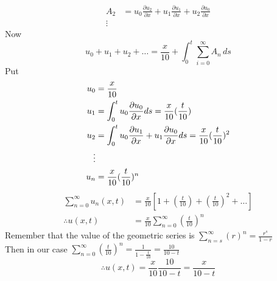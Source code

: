 \begin{example}
\begin{align*}
        \\
        A_2 & = u_0 \frac{\partial u_2}{\partial x} + u_1 \frac{\partial u_1}{\partial x} + u_2 \frac{\partial u_0}{\partial x}
        \\
        \vdots
    \end{align*}
    Now
    \[
        u_0 + u_1 + u_2+\dots = \frac{x}{10} + \int_{0}^{t} \sum_{i=0}^{\infty} A_n  \,ds
    \]
    Put
    \begin{align*}
        u_0 & =  \frac{x}{10}
        \\
        u_1 & = \int_{0}^{t} u_0 \pdv{u_0}{x}ds =\frac{x}{10} (\frac{t}{10})
        \\
        u_2 & = \int_{0}^{t}u_0 \pdv{u_1}{x} + u_1 \pdv{u_0}{x}ds = \frac{x}{10} (\frac{t}{10})^2
        \\
        \vdots
        \\
        u_n & = \frac{x}{10} (\frac{t}{10})^n
    \end{align*}
    \begin{align*}
        \sum_{n=0}^{\infty} u_n(x,t) & = \frac{x}{10}\left[1 +\left(\frac{t}{10}\right) +\left(\frac{t}{10}\right)^2 +\dots \right]
        \\
        \therefore u(x,t)            & = \frac{x}{10}\sum_{n=0}^{\infty} \left(\frac{t}{10}\right)^n
    \end{align*}
    Remember that the value of the geometric series is $\displaystyle \sum_{n=s}^{\infty} \left(r\right)^n  = \frac{r^s}{1-r}  $
    \\
    Then in our case $\displaystyle \sum_{n=0}^{\infty} \left(\frac{t}{10}\right)^n = \frac{1}{1-\frac{t}{10}} = \frac{10}{10-t}$
    \[
        \therefore u(x,t) = \frac{x}{10}\frac{10}{10-t} = \frac{x}{10-t}
    \]

\end{example}

